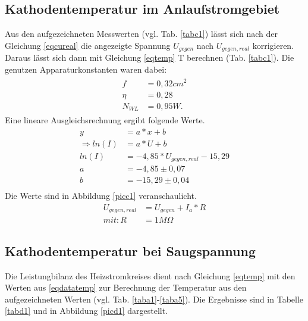 \subsection{Kathodentemperatur im Anlaufstromgebiet}
Aus den aufgezeichneten Messwerten (vgl. Tab. \ref{tabc1}) lässt sich nach der Gleichung \ref{eqcureal}
die angezeigte Spannung $U_{gegen}$ nach $U_{gegen,real}$ korrigieren. Daraus lässt sich dann mit 
Gleichung \ref{eqtemp} T berechnen (Tab. \ref{tabc1}). Die genutzen Apparaturkonstanten waren dabei:
\begin{align}
\begin{split}
f&=0,32cm^2 \label{eqdatatemp}\\
\eta&=0,28\\
N_{WL}&=0,95W .
\end{split}
\end{align} 
Eine lineare Ausgleichsrechnung \cite{linreg} ergibt folgende Werte.
\begin{align}
y&=a*x+b\\
\Rightarrow ln(I)&=a*U+b\\
ln(I)&=-4,85*U_{gegen,real}-15,29\\
a&=-4,85\pm0,07\\
b&=-15,29\pm0,04\\
\end{align}
Die Werte sind in Abbildung \ref{picc1} veranschaulicht.
\begin{align}
U_{gegen,real}&=U_{gegen}+I_a*R \label{eqcureal}\\
mit: R&=1M\Omega
\end{align}


 
\FloatBarrier
\subsection{Kathodentemperatur bei Saugspannung}
Die Leistungbilanz des Heizstromkreises dient nach Gleichung \ref{eqtemp} mit den Werten aus \ref{eqdatatemp}
zur Berechnung der Temperatur aus den aufgezeichneten Werten (vgl. Tab. \ref{taba1}-\ref{taba5}). Die Ergebnisse
sind in Tabelle \ref{tabd1} und in Abbildung \ref{picd1} dargestellt. 
 
\FloatBarrier
